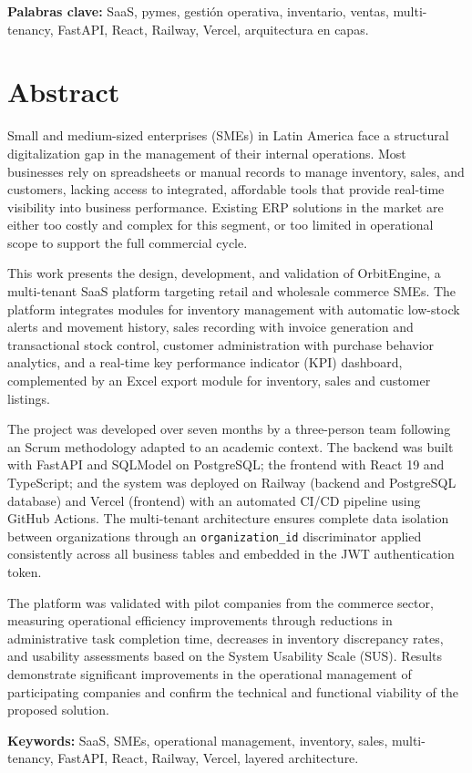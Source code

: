 \textbf{Palabras clave:} SaaS, pymes, gestión operativa, inventario, ventas, multi-tenancy, FastAPI, React, Railway, Vercel, arquitectura en capas.

\clearpage
\chapter*{Abstract}

Small and medium-sized enterprises (SMEs) in Latin America face a structural digitalization gap in the management of their internal operations. Most businesses rely on spreadsheets or manual records to manage inventory, sales, and customers, lacking access to integrated, affordable tools that provide real-time visibility into business performance. Existing ERP solutions in the market are either too costly and complex for this segment, or too limited in operational scope to support the full commercial cycle.

This work presents the design, development, and validation of OrbitEngine, a multi-tenant SaaS platform targeting retail and wholesale commerce SMEs. The platform integrates modules for inventory management with automatic low-stock alerts and movement history, sales recording with invoice generation and transactional stock control, customer administration with purchase behavior analytics, and a real-time key performance indicator (KPI) dashboard, complemented by an Excel export module for inventory, sales and customer listings.

The project was developed over seven months by a three-person team following an Scrum methodology adapted to an academic context. The backend was built with FastAPI and SQLModel on PostgreSQL; the frontend with React 19 and TypeScript; and the system was deployed on Railway (backend and PostgreSQL database) and Vercel (frontend) with an automated CI/CD pipeline using GitHub Actions. The multi-tenant architecture ensures complete data isolation between organizations through an \texttt{organization\_id} discriminator applied consistently across all business tables and embedded in the JWT authentication token.

The platform was validated with pilot companies from the commerce sector, measuring operational efficiency improvements through reductions in administrative task completion time, decreases in inventory discrepancy rates, and usability assessments based on the System Usability Scale (SUS). Results demonstrate significant improvements in the operational management of participating companies and confirm the technical and functional viability of the proposed solution.

\textbf{Keywords:} SaaS, SMEs, operational management, inventory, sales, multi-tenancy, FastAPI, React, Railway, Vercel, layered architecture.
